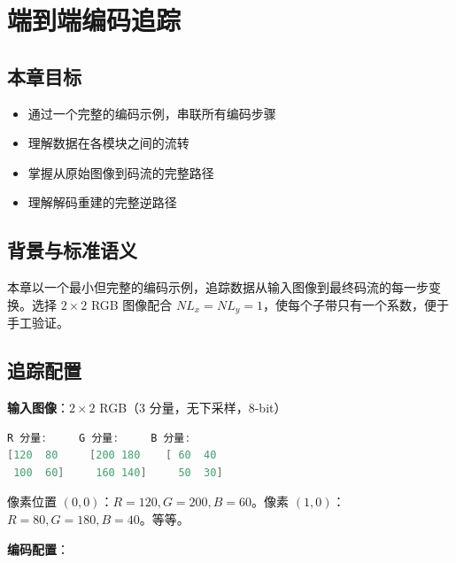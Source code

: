 
\chapter{端到端编码追踪}\label{ch:e2e-trace}

\section{本章目标}

\begin{itemize}
  \item 通过一个完整的编码示例，串联所有编码步骤
  \item 理解数据在各模块之间的流转
  \item 掌握从原始图像到码流的完整路径
  \item 理解解码重建的完整逆路径
\end{itemize}

\section{背景与标准语义}

本章以一个最小但完整的编码示例，追踪数据从输入图像到最终码流的每一步变换。选择 $2\times2$ RGB 图像配合 $NL_x=NL_y=1$，使每个子带只有一个系数，便于手工验证。

\section{追踪配置}

\textbf{输入图像}：$2\times2$ RGB（3 分量，无下采样，8-bit）

\begin{lstlisting}[language=C,numbers=none]
R 分量:     G 分量:     B 分量:
[120  80     [200 180    [ 60  40
 100  60]     160 140]     50  30]
\end{lstlisting}

像素位置 $(0,0)$：$R=120, G=200, B=60$。像素 $(1,0)$：$R=80, G=180, B=40$。等等。

\textbf{编码配置}：


